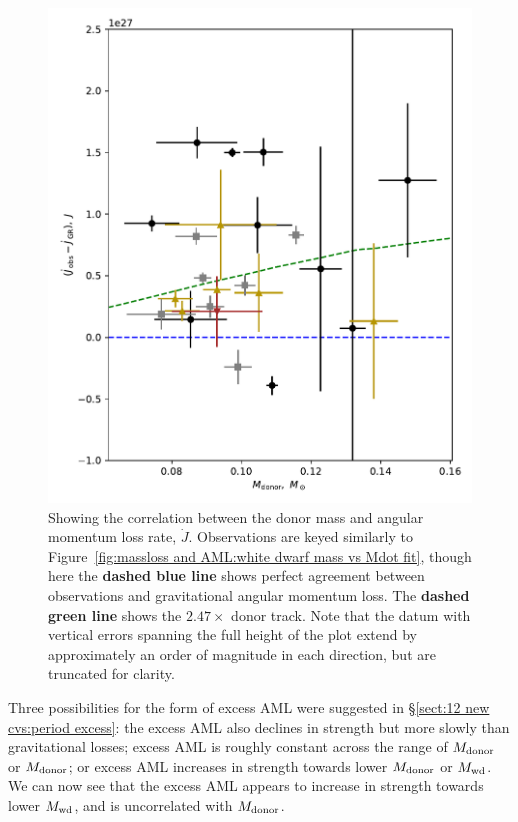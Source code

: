 \begin{figure}
    \centering
    \includegraphics[width=\textwidth]{figures/results/Mdot/Mr_Jdot_nofit.pdf}
    \caption{Showing the correlation between the donor mass and angular momentum loss rate, $\dot J$. Observations are keyed similarly to Figure~\ref{fig:massloss and AML:white dwarf mass vs Mdot fit}, though here the {\bf dashed blue line} shows perfect agreement between observations and gravitational angular momentum loss. The {\bf dashed green line} shows the $2.47\times$ donor track. Note that the datum with vertical errors spanning the full height of the plot extend by approximately an order of magnitude in each direction, but are truncated for clarity.}
    \label{fig:massloss and AML:donor mass vs Jdot fit}
\end{figure}


Three possibilities for the form of excess AML were suggested in \S\ref{sect:12 new cvs:period excess}: the excess AML also declines in strength but more slowly than gravitational losses; excess AML is roughly constant across the range of $M_{\rm donor}$ or $M_{\rm donor}$; or excess AML increases in strength towards lower $M_{\rm donor}$ or $M_{\rm wd}$.
We can now see that the excess AML appears to increase in strength towards lower $M_{\rm wd}$, and is uncorrelated with $M_{\rm donor}$.

